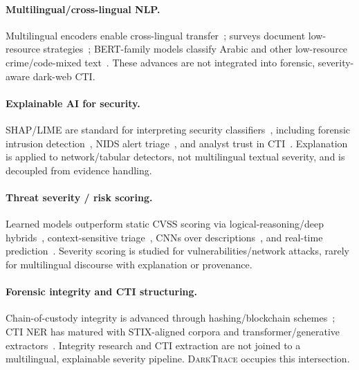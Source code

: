 \documentclass[11pt,a4paper]{article}
\newcommand{\framework}{\textsc{DarkTrace}}
\begin{document}
\paragraph{Multilingual/cross-lingual NLP.} Multilingual encoders enable cross-lingual
transfer~\cite{conneau2020xlmr}; surveys document low-resource
strategies~\cite{pakray2025nlp}; BERT-family models classify Arabic and other
low-resource crime/code-mixed text~\cite{alharbi2025bert,nazir2025multilingual,thangaraj2024crosslingual}.
These advances are not integrated into forensic, severity-aware dark-web CTI.

\paragraph{Explainable AI for security.} SHAP/LIME are standard for interpreting security
classifiers~\cite{salih2023perspective,gaspar2024xai}, including forensic intrusion
detection~\cite{hermosilla2025xai}, NIDS alert triage~\cite{kalakoti2025evaluating}, and
analyst trust in CTI~\cite{sunkara2025xai}. Explanation is applied to network/tabular
detectors, not multilingual textual severity, and is decoupled from evidence handling.

\paragraph{Threat severity / risk scoring.} Learned models outperform static CVSS scoring
via logical-reasoning/deep hybrids~\cite{zeng2022licality,zeng2024illation},
context-sensitive triage~\cite{hore2023triage}, CNNs over
descriptions~\cite{saklani2025severity}, and real-time
prediction~\cite{amora2025realtime}. Severity scoring is studied for
vulnerabilities/network attacks, rarely for multilingual discourse with explanation or
provenance.

\paragraph{Forensic integrity and CTI structuring.} Chain-of-custody integrity is
advanced through hashing/blockchain
schemes~\cite{lone2019forensicchain,ali2022procedure,pontecuevas2025blockchain,patil2024potential,loffi2025management};
CTI NER has matured with STIX-aligned corpora and transformer/generative
extractors~\cite{echchammakhy2025cyberner,feng2025promptbart,wang2022aptner,evangelatos2021ner,kim2020automatic,sorokoletova2024scalable}.
Integrity research and CTI extraction are not joined to a multilingual, explainable
severity pipeline. \framework{} occupies this intersection.
\end{document}
